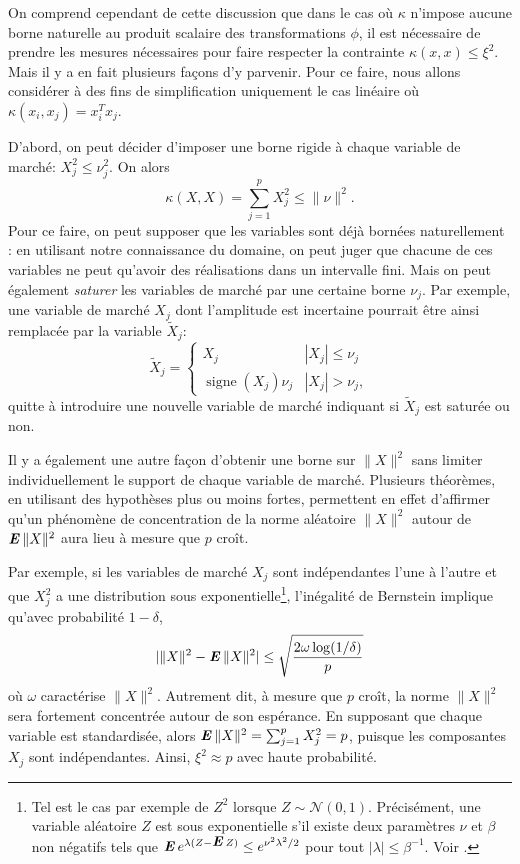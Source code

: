 On comprend cependant de cette discussion que dans le cas où $\kappa$ n'impose aucune borne
naturelle au produit scalaire des transformations $\phi$, il est nécessaire de prendre les
mesures nécessaires pour faire respecter la contrainte $\kappa(x,x)\leq\xi^2$. Mais il y a en fait
plusieurs façons d'y parvenir. Pour ce faire, nous allons considérer à
des fins de simplification uniquement le cas linéaire où $\kappa(x_i,x_j) = x_i^Tx_j$.

D'abord, on peut décider d'imposer une borne rigide à chaque variable de marché: $X_j^2 \leq
\nu_j^2$. On alors 
\begin{equation}
  \kappa(X,X) = \sum_{j=1}^p X_j^2 \leq \|\nu\|^2.
\end{equation}
Pour ce faire, on peut supposer que les variables sont déjà bornées naturellement : en
utilisant notre connaissance du domaine, on peut juger que chacune de ces variables ne
peut qu'avoir des réalisations dans un intervalle fini. Mais on peut également
\textit{saturer} les variables de marché par une certaine borne $\nu_j$. Par exemple, une
variable de marché $X_j$ dont l'amplitude est incertaine pourrait être ainsi remplacée par
la variable $\tilde X_j$:
\begin{equation}
  \tilde X_j = \begin{cases}
    X_j & |X_j| \leq \nu_j\\
     \operatorname{signe}(X_j)\nu_j & |X_j| > \nu_j,
  \end{cases}
\end{equation}
quitte à introduire une nouvelle variable de marché indiquant si $\tilde X_j$ est saturée
ou non.

Il y a également une autre façon d'obtenir une borne sur $\|X\|^2$ sans limiter
individuellement le support de chaque variable de marché. Plusieurs théorèmes, en
utilisant des hypothèses plus ou moins fortes, permettent en effet d'affirmer qu'un
phénomène de concentration de la norme aléatoire $\|X\|^2$ autour de $\operatorname{\mbox{\textbf{\textit{E}}}}\|X\|^2$ aura lieu
à mesure que $p$ croît.

Par exemple, si les variables de marché $X_j$ sont indépendantes l'une à l'autre et que
$X_j^2$ a une distribution sous exponentielle\footnote{Tel est le cas par exemple de $Z^2$
  lorsque $Z \sim \mathscr{N}(0,1)$. Précisément, une variable aléatoire $Z$ est sous
  exponentielle s'il existe deux paramètres $\nu$ et $\beta$ non négatifs tels que
  $\operatorname{\mbox{\textbf{\textit{E}}}} e^{\lambda(Z-\operatorname{\mbox{\textbf{\textit{E}}}} Z)} \leq e^{\nu^2\lambda^2/2}$ pour tout
  $|\lambda| \leq \beta^{-1}$. Voir \cite{boucheron2013concentration}.}, l'inégalité de Bernstein
implique qu'avec probabilité $1-\delta$,
\begin{equation}
  |\|X\|^2 - \operatorname{\mbox{\textbf{\textit{E}}}}\|X\|^2| \leq \sqrt\frac{2\omega\log(1/\delta)}{p}
\end{equation}
où $\omega$ caractérise $\|X\|^2$.  Autrement dit, à mesure que $p$ croît, la norme
$\|X\|^2$ sera fortement concentrée autour de son espérance. En supposant que chaque
variable est standardisée, alors $\operatorname{\mbox{\textbf{\textit{E}}}}\|X\|^2 = \sum_{j=1}^pX_j^2 = p$, puisque les composantes
$X_j$ sont indépendantes. Ainsi, $\xi^2 \approx p$ avec haute probabilité.

